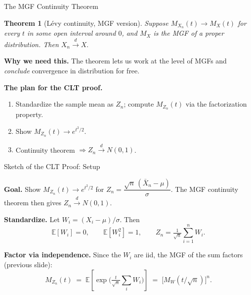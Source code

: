 \documentclass[aspectratio=169, handout, t]{beamer}
\newtheorem{thm}{Theorem}
\numberwithin{equation}{section}
\begin{document}
\begin{frame}{The MGF Continuity Theorem}

\begin{thm}[L\'evy continuity, MGF version]
Suppose $M_{X_n}(t) \to M_X(t)$ for every $t$ in some open interval around $0$, and $M_X$ is the MGF of a proper distribution. Then $X_n \overset{d}{\to} X.$
\end{thm}

\pause

\medskip

\textbf{Why we need this.} The theorem lets us work at the level of MGFs and \emph{conclude} convergence in distribution for free.

\pause

\medskip

\textbf{The plan for the CLT proof.}
\begin{enumerate}\setlength\itemsep{1pt}
\item Standardize the sample mean as $Z_n$; compute $M_{Z_n}(t)$ via the factorization property.
\item Show $M_{Z_n}(t) \to e^{t^2/2}$.
\item Continuity theorem $\Rightarrow Z_n \overset{d}{\to} N(0,1)$.
\end{enumerate}

\end{frame}


\begin{frame}{Sketch of the CLT Proof: Setup}

\textbf{Goal.} Show $M_{Z_n}(t) \to e^{t^2/2}$ for $Z_n = \dfrac{\sqrt n\,(\bar X_n - \mu)}{\sigma}$. The MGF continuity theorem then gives $Z_n \overset{d}{\to} N(0,1)$.

\pause

\medskip

\textbf{Standardize.} Let $W_i = (X_i - \mu)/\sigma$. Then
\[
\mathbb{E}[W_i] = 0, \qquad \mathbb{E}[W_i^2] = 1, \qquad Z_n = \tfrac{1}{\sqrt n}\sum_{i=1}^n W_i.
\]

\pause

\medskip

\textbf{Factor via independence.} Since the $W_i$ are iid, the MGF of the sum factors (previous slide):
\[
M_{Z_n}(t) \;=\; \mathbb{E}\!\left[\exp\!\Big(\tfrac{t}{\sqrt n}\sum_i W_i\Big)\right] \;=\; \bigl[M_W(t/\sqrt n)\bigr]^n.
\]

\end{frame}
\end{document}
